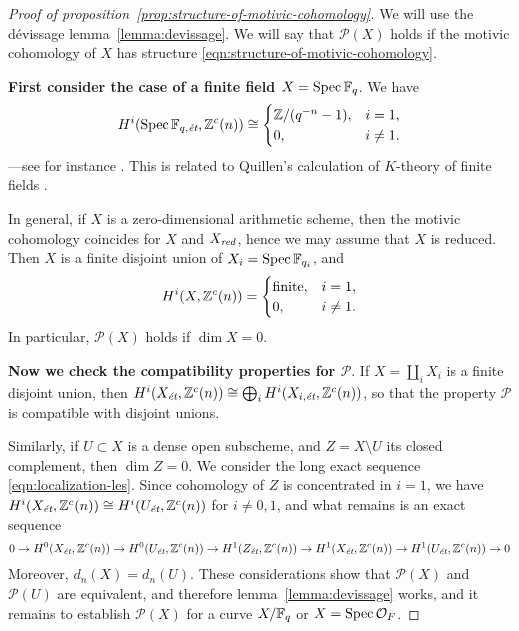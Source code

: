 \documentclass{article}
\numberwithin{equation}{section}
\begin{document}
\begin{proof}[Proof of proposition~\ref{prop:structure-of-motivic-cohomology}]
  We will use the dévissage lemma~\ref{lemma:devissage}. We will say that
  $\mathcal{P} (X)$ holds if the motivic cohomology of $X$ has structure
  \eqref{eqn:structure-of-motivic-cohomology}.

  \vspace{1em}

  \textbf{First consider the case of a finite field $X = \Spec \FF_q$}.
  We have
  \begin{equation}
    \label{eqn:motivic-cohomology-finite-fields}
    H^i (\Spec \FF_{q,\et}, \ZZ^c (n)) \cong
    \begin{cases}
      \ZZ/(q^{-n} - 1), & i = 1, \\
      0, & i \ne 1.
    \end{cases}
  \end{equation}
  ---see for instance \cite[Example~4.2]{Geisser-2017}. This is related to
  Quillen's calculation of $K$-theory of finite fields \cite{Quillen-1972}.

  In general, if $X$ is a zero-dimensional arithmetic scheme, then the motivic
  cohomology coincides for $X$ and $X_\red$, hence we may assume that $X$ is
  reduced. Then $X$ is a finite disjoint union of $X_i = \Spec \FF_{q_i}$, and
  \begin{equation}
    H^i (X, \ZZ^c (n)) = \begin{cases}
      \text{finite}, & i = 1, \\
      0, & i \ne 1.
    \end{cases}
  \end{equation}
  In particular, $\mathcal{P} (X)$ holds if $\dim X = 0$.

  \vspace{1em}

  \textbf{Now we check the compatibility properties for $\mathcal{P}$}.
  If $X = \coprod_i X_i$ is a finite disjoint union, then
  $H^i (X_\et, \ZZ^c (n)) \cong \bigoplus_i H^i (X_{i,\et}, \ZZ^c (n))$,
  so that the property $\mathcal{P}$ is compatible with disjoint unions.

  Similarly, if $U \subset X$ is a dense open subscheme, and $Z = X\setminus U$
  its closed complement, then $\dim Z = 0$. We consider the long exact sequence
  \eqref{eqn:localization-les}. Since cohomology of $Z$ is concentrated in
  $i = 1$, we have $H^i (X_\et, \ZZ^c (n)) \cong H^i (U_\et, \ZZ^c (n))$ for
  $i \ne 0,1$, and what remains is an exact sequence
  \[ 0 \to H^0 (X_\et, \ZZ^c (n)) \to
    H^0 (U_\et, \ZZ^c (n)) \to
    H^1 (Z_\et, \ZZ^c (n)) \to
    H^1 (X_\et, \ZZ^c (n)) \to
    H^1 (U_\et, \ZZ^c (n)) \to 0 \]
  Moreover, $d_n (X) = d_n (U)$. These considerations show that
  $\mathcal{P} (X)$ and $\mathcal{P} (U)$ are equivalent, and therefore
  lemma~\ref{lemma:devissage} works, and it remains to establish
  $\mathcal{P} (X)$ for a curve $X/\FF_q$ or $X = \Spec \mathcal{O}_F$.


\end{proof}
\end{document}
